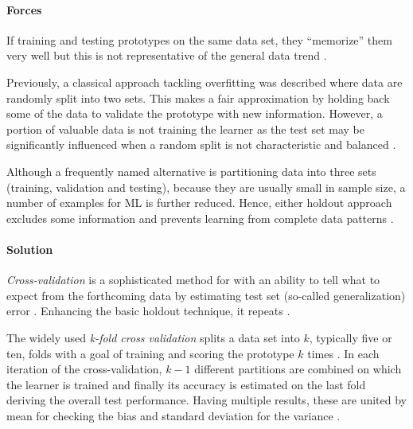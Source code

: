 \paragraph*{Forces}
\begin{compactitem}
  \item If training and testing prototypes on the same data set, they \enquote{memorize} them very well but this is not representative of the general data trend \parencites{FosterProvost2013DataThinking}{SAS2016}.
  \item Previously, a classical approach tackling overfitting was described where data are randomly split into two sets. 
  This makes a fair approximation by holding back some of the data to validate the prototype with new information.
  However, a portion of valuable data is not training the learner as the test set may be significantly influenced when a random split is not characteristic and balanced \parencites{NinaBookR2014}{FosterProvost2013DataThinking}. 
  \item Although a frequently named alternative is partitioning data into three sets (training, validation and testing), because they are usually small in sample size, a number of examples for \ac{ML} is further reduced. 
  Hence, either holdout approach excludes some information and prevents learning from complete data patterns \parencite{FieldCadyDSBook}.
\end{compactitem}

\paragraph*{Solution}
\emph{Cross-validation} is a sophisticated method for  with an ability to tell what to expect from the forthcoming data by estimating test set (so-called generalization) error \parencite[140]{FosterProvost2013DataThinking}. 
Enhancing the basic holdout technique, it repeats  \parencite[111]{NinaBookR2014}.

The widely used \emph{k-fold cross validation} splits a data set into $k$, typically five or ten, folds with a goal of training and scoring the prototype $k$ times \parencite{FosterProvost2013DataThinking}.
In each iteration of the cross-validation, $k-1$ different partitions are combined on which the learner is trained and finally its accuracy is estimated on the last fold deriving the overall test performance. 
Having multiple results, these are united by mean for checking the bias and standard deviation for the variance \parencite{NinaBookR2014}.

